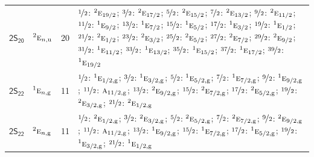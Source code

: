 \documentclass[10pt,a4paper]{article}
\numberwithin{equation}{section}
\newcommand{\grp}[1]{\mathsf{#1}}
\newcommand{\irr}[1]{\text{\normalfont\scshape #1}}
\newcommand{\conjpair}[1]{{}^{#1}}
\newcommand{\ptag}[1]{\mathrm{#1}}
\newlength{\fillwidth}\newlength{\cellwidth}\newlength{\colwidth}
\begin{document}
{\begin{longtable}{@{}llr>{\RaggedRight\arraybackslash}p{\fillwidth}@{}}
\href{2S20.pdf}{$\grp{2S_{20}}$} & $\conjpair{2}\irr{e}_{n,\ptag{u}}$ & 20 & $\nicefrac{1}{2}$: $\conjpair{2}\irr{e}_{19/2}$; $\nicefrac{3}{2}$: $\conjpair{2}\irr{e}_{17/2}$; $\nicefrac{5}{2}$: $\conjpair{2}\irr{e}_{15/2}$; $\nicefrac{7}{2}$: $\conjpair{2}\irr{e}_{13/2}$; $\nicefrac{9}{2}$: $\conjpair{2}\irr{e}_{11/2}$; $\nicefrac{11}{2}$: $\conjpair{1}\irr{e}_{9/2}$; $\nicefrac{13}{2}$: $\conjpair{1}\irr{e}_{7/2}$; $\nicefrac{15}{2}$: $\conjpair{1}\irr{e}_{5/2}$; $\nicefrac{17}{2}$: $\conjpair{1}\irr{e}_{3/2}$; $\nicefrac{19}{2}$: $\conjpair{1}\irr{e}_{1/2}$; $\nicefrac{21}{2}$: $\conjpair{2}\irr{e}_{1/2}$; $\nicefrac{23}{2}$: $\conjpair{2}\irr{e}_{3/2}$; $\nicefrac{25}{2}$: $\conjpair{2}\irr{e}_{5/2}$; $\nicefrac{27}{2}$: $\conjpair{2}\irr{e}_{7/2}$; $\nicefrac{29}{2}$: $\conjpair{2}\irr{e}_{9/2}$; $\nicefrac{31}{2}$: $\conjpair{1}\irr{e}_{11/2}$; $\nicefrac{33}{2}$: $\conjpair{1}\irr{e}_{13/2}$; $\nicefrac{35}{2}$: $\conjpair{1}\irr{e}_{15/2}$; $\nicefrac{37}{2}$: $\conjpair{1}\irr{e}_{17/2}$; $\nicefrac{39}{2}$: $\conjpair{1}\irr{e}_{19/2}$\\
\href{2S22.pdf}{$\grp{2S_{22}}$} & $\conjpair{1}\irr{e}_{n,\ptag{g}}$ & 11 & $\nicefrac{1}{2}$: $\conjpair{1}\irr{e}_{1/2,\ptag{g}}$; $\nicefrac{3}{2}$: $\conjpair{1}\irr{e}_{3/2,\ptag{g}}$; $\nicefrac{5}{2}$: $\conjpair{1}\irr{e}_{5/2,\ptag{g}}$; $\nicefrac{7}{2}$: $\conjpair{1}\irr{e}_{7/2,\ptag{g}}$; $\nicefrac{9}{2}$: $\conjpair{1}\irr{e}_{9/2,\ptag{g}}$; $\nicefrac{11}{2}$: $\irr{a}_{11/2,\ptag{g}}$; $\nicefrac{13}{2}$: $\conjpair{2}\irr{e}_{9/2,\ptag{g}}$; $\nicefrac{15}{2}$: $\conjpair{2}\irr{e}_{7/2,\ptag{g}}$; $\nicefrac{17}{2}$: $\conjpair{2}\irr{e}_{5/2,\ptag{g}}$; $\nicefrac{19}{2}$: $\conjpair{2}\irr{e}_{3/2,\ptag{g}}$; $\nicefrac{21}{2}$: $\conjpair{2}\irr{e}_{1/2,\ptag{g}}$\\
\href{2S22.pdf}{$\grp{2S_{22}}$} & $\conjpair{2}\irr{e}_{n,\ptag{g}}$ & 11 & $\nicefrac{1}{2}$: $\conjpair{2}\irr{e}_{1/2,\ptag{g}}$; $\nicefrac{3}{2}$: $\conjpair{2}\irr{e}_{3/2,\ptag{g}}$; $\nicefrac{5}{2}$: $\conjpair{2}\irr{e}_{5/2,\ptag{g}}$; $\nicefrac{7}{2}$: $\conjpair{2}\irr{e}_{7/2,\ptag{g}}$; $\nicefrac{9}{2}$: $\conjpair{2}\irr{e}_{9/2,\ptag{g}}$; $\nicefrac{11}{2}$: $\irr{a}_{11/2,\ptag{g}}$; $\nicefrac{13}{2}$: $\conjpair{1}\irr{e}_{9/2,\ptag{g}}$; $\nicefrac{15}{2}$: $\conjpair{1}\irr{e}_{7/2,\ptag{g}}$; $\nicefrac{17}{2}$: $\conjpair{1}\irr{e}_{5/2,\ptag{g}}$; $\nicefrac{19}{2}$: $\conjpair{1}\irr{e}_{3/2,\ptag{g}}$; $\nicefrac{21}{2}$: $\conjpair{1}\irr{e}_{1/2,\ptag{g}}$\\

\end{longtable}}
\end{document}
